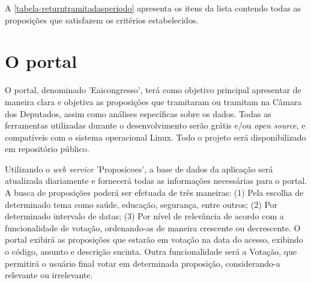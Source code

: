 \documentclass[
	12pt,				%
	openright,			%
	twoside,			%
	a4paper,			%
	english,			%
	french,				%
	spanish,			%
	brazil				%
	]{abntex2}
\begin{document}
A \autoref{tabela-returntramitadasperiodo} apresenta os itens da lista contendo todas as proposições que satisfazem os critérios estabelecidos.

\begin{table}[htb]
\end{table}

\chapter{O portal} 
O portal, denominado 'Eaicongresso', terá como objetivo principal apresentar de maneira clara e objetiva as proposições que tramitaram ou tramitam na Câmara dos 
Deputados, assim como análises específicas sobre os dados. Todas as ferramentas utilizadas durante o desenvolvimento serão grátis 
e/ou \emph{open source}, e compatíveis com o sistema operacional Linux. Todo o projeto será disponibilizado em repositório público.

Utilizando o \emph{web service} 'Proposicoes', a base de dados da aplicação será atualizada diariamente 
e fornecerá todas as informações necessárias para o portal. A busca de proposições poderá ser efetuada de três maneiras: (1) Pela escolha de determinado tema como saúde, educação, segurança, entre outros;
(2) Por determinado intervalo de datas; (3) Por nível de relevância de acordo com a funcionalidade de votação, ordenando-as de 
maneira crescente ou decrescente. O portal exibirá as proposições que estarão em votação na data do acesso, exibindo o código, 
assunto e descrição sucinta. Outra funcionalidade será a Votação, que permitirá o usuário final votar em determinada proposição, considerando-a relevante ou irrelevante.
\end{document}
